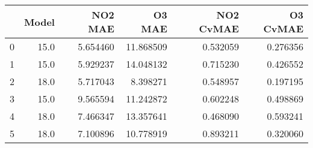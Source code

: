 \begin{tabular}{lrrrrr}
\toprule
{} &  Model &   NO2 MAE &     O3 MAE &  NO2 CvMAE &  O3 CvMAE \\
\midrule
0 &   15.0 &  5.654460 &  11.868509 &   0.532059 &  0.276356 \\
1 &   15.0 &  5.929237 &  14.048132 &   0.715230 &  0.426552 \\
2 &   18.0 &  5.717043 &   8.398271 &   0.548957 &  0.197195 \\
3 &   15.0 &  9.565594 &  11.242872 &   0.602248 &  0.498869 \\
4 &   18.0 &  7.466347 &  13.357641 &   0.468090 &  0.593241 \\
5 &   18.0 &  7.100896 &  10.778919 &   0.893211 &  0.320060 \\
\bottomrule
\end{tabular}
